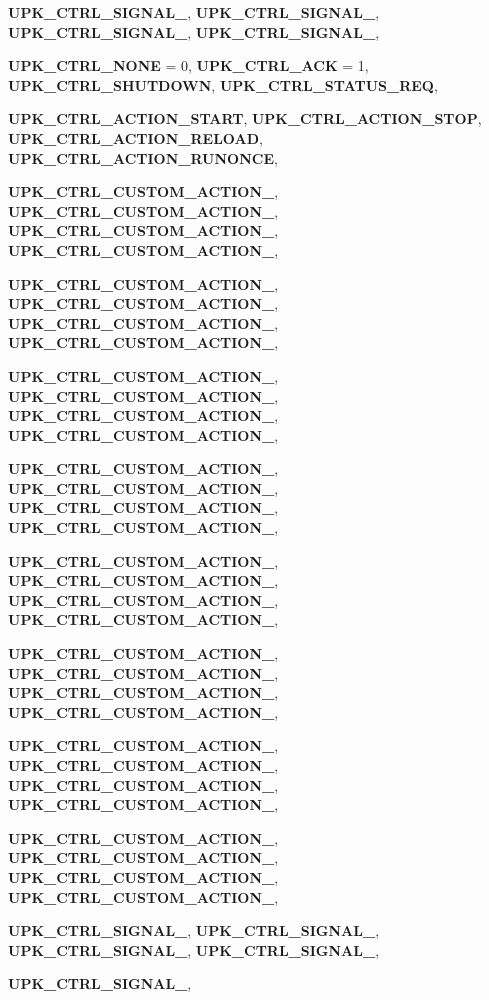 \begin{DoxyCompactItemize}
{\bf UPK\_\-CTRL\_\-SIGNAL\_}, 
{\bf UPK\_\-CTRL\_\-SIGNAL\_}, 
{\bf UPK\_\-CTRL\_\-SIGNAL\_}, 
{\bf UPK\_\-CTRL\_\-SIGNAL\_}, 
\par
{\bf UPK\_\-CTRL\_\-NONE} =  0, 
{\bf UPK\_\-CTRL\_\-ACK} =  1, 
{\bf UPK\_\-CTRL\_\-SHUTDOWN}, 
{\bf UPK\_\-CTRL\_\-STATUS\_\-REQ}, 
\par
{\bf UPK\_\-CTRL\_\-ACTION\_\-START}, 
{\bf UPK\_\-CTRL\_\-ACTION\_\-STOP}, 
{\bf UPK\_\-CTRL\_\-ACTION\_\-RELOAD}, 
{\bf UPK\_\-CTRL\_\-ACTION\_\-RUNONCE}, 
\par
{\bf UPK\_\-CTRL\_\-CUSTOM\_\-ACTION\_}, 
{\bf UPK\_\-CTRL\_\-CUSTOM\_\-ACTION\_}, 
{\bf UPK\_\-CTRL\_\-CUSTOM\_\-ACTION\_}, 
{\bf UPK\_\-CTRL\_\-CUSTOM\_\-ACTION\_}, 
\par
{\bf UPK\_\-CTRL\_\-CUSTOM\_\-ACTION\_}, 
{\bf UPK\_\-CTRL\_\-CUSTOM\_\-ACTION\_}, 
{\bf UPK\_\-CTRL\_\-CUSTOM\_\-ACTION\_}, 
{\bf UPK\_\-CTRL\_\-CUSTOM\_\-ACTION\_}, 
\par
{\bf UPK\_\-CTRL\_\-CUSTOM\_\-ACTION\_}, 
{\bf UPK\_\-CTRL\_\-CUSTOM\_\-ACTION\_}, 
{\bf UPK\_\-CTRL\_\-CUSTOM\_\-ACTION\_}, 
{\bf UPK\_\-CTRL\_\-CUSTOM\_\-ACTION\_}, 
\par
{\bf UPK\_\-CTRL\_\-CUSTOM\_\-ACTION\_}, 
{\bf UPK\_\-CTRL\_\-CUSTOM\_\-ACTION\_}, 
{\bf UPK\_\-CTRL\_\-CUSTOM\_\-ACTION\_}, 
{\bf UPK\_\-CTRL\_\-CUSTOM\_\-ACTION\_}, 
\par
{\bf UPK\_\-CTRL\_\-CUSTOM\_\-ACTION\_}, 
{\bf UPK\_\-CTRL\_\-CUSTOM\_\-ACTION\_}, 
{\bf UPK\_\-CTRL\_\-CUSTOM\_\-ACTION\_}, 
{\bf UPK\_\-CTRL\_\-CUSTOM\_\-ACTION\_}, 
\par
{\bf UPK\_\-CTRL\_\-CUSTOM\_\-ACTION\_}, 
{\bf UPK\_\-CTRL\_\-CUSTOM\_\-ACTION\_}, 
{\bf UPK\_\-CTRL\_\-CUSTOM\_\-ACTION\_}, 
{\bf UPK\_\-CTRL\_\-CUSTOM\_\-ACTION\_}, 
\par
{\bf UPK\_\-CTRL\_\-CUSTOM\_\-ACTION\_}, 
{\bf UPK\_\-CTRL\_\-CUSTOM\_\-ACTION\_}, 
{\bf UPK\_\-CTRL\_\-CUSTOM\_\-ACTION\_}, 
{\bf UPK\_\-CTRL\_\-CUSTOM\_\-ACTION\_}, 
\par
{\bf UPK\_\-CTRL\_\-CUSTOM\_\-ACTION\_}, 
{\bf UPK\_\-CTRL\_\-CUSTOM\_\-ACTION\_}, 
{\bf UPK\_\-CTRL\_\-CUSTOM\_\-ACTION\_}, 
{\bf UPK\_\-CTRL\_\-CUSTOM\_\-ACTION\_}, 
\par
{\bf UPK\_\-CTRL\_\-SIGNAL\_}, 
{\bf UPK\_\-CTRL\_\-SIGNAL\_}, 
{\bf UPK\_\-CTRL\_\-SIGNAL\_}, 
{\bf UPK\_\-CTRL\_\-SIGNAL\_}, 
\par
{\bf UPK\_\-CTRL\_\-SIGNAL\_}, 

\end{DoxyCompactItemize}
